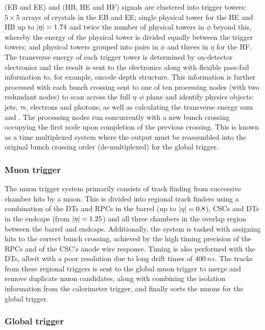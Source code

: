\ECAL (EB and EE) and \HCAL (HB, HE and HF) signals are clustered into trigger towers: ${5\times 5}$ arrays of crystals in the EB and EE; single physical tower for the HE and HB up to ${|\eta|=1.74}$ and twice the number of physical towers in $\phi$ beyond this, whereby the energy of the physical tower is divided equally between the trigger towers; and physical towers grouped into pairs in $\phi$ and threes in $\eta$ for the HF. The transverse energy of each trigger tower is determined by on-detector electronics and the result is sent to the \HWT electronics along with flexible pass-fail information to, for example, encode depth structure. This information is further processed with each bunch crossing sent to one of ten processing nodes (with two redundant nodes) to scan across the full ${\eta}$--${\phi}$ plane and identify physics objects: jets, $\tau$s, electrons and photons; as well as calculating the transverse energy sum and \etmiss. The processing nodes run concurrently with a new bunch crossing occupying the first node upon completion of the previous crossing. This is known as a time multiplexed system where the output must be reassembled into the original bunch crossing order (de-multiplexed) for the global trigger.


\subsubsection{Muon trigger}

The muon trigger system primarily consists of track finding from successive chamber hits by a muon. This is divided into regional track finders using a combination of the DTs and RPCs in the barrel (up to ${|\eta|=0.8}$), CSCs and DTs in the endcaps (from ${|\eta|=1.25}$) and all three chambers in the overlap region between the barrel and endcaps. Additionally, the system is tasked with assigning hits to the correct bunch crossing, achieved by the high timing precision of the RPCs and of the CSC's anode wire response. Timing is also performed with the DTs, albeit with a poor resolution due to long drift times of ${\SI{400}{ns}}$. The tracks from these regional triggers is sent to the global muon trigger to merge and remove duplicate muon candidates, along with combining the isolation information from the calorimeter trigger, and finally sorts the muons for the global trigger.


\subsubsection{Global trigger}

